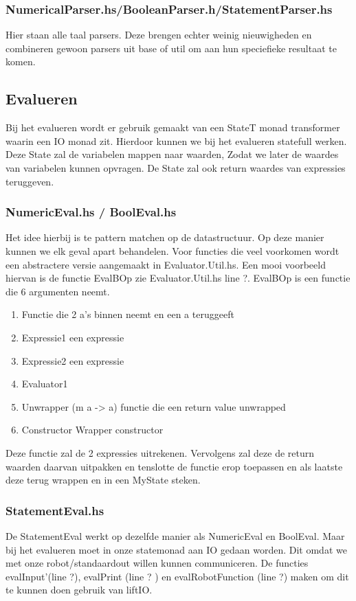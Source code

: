\documentclass[a4paper,10pt]{article}
\begin{document}
  \subsubsection{NumericalParser.hs/BooleanParser.h/StatementParser.hs}
  Hier staan alle taal parsers. Deze brengen echter weinig nieuwigheden en
  combineren gewoon parsers uit base of util om aan hun speciefieke resultaat te komen.



\subsection{Evalueren}
  Bij het evalueren wordt er gebruik gemaakt van een StateT monad transformer waarin een IO monad zit.
  Hierdoor kunnen we bij het evalueren statefull werken. Deze State zal de variabelen mappen naar waarden,
  Zodat we later de waardes van variabelen kunnen opvragen.
  De State zal ook return waardes van expressies teruggeven.
  
  \subsubsection{NumericEval.hs / BoolEval.hs}

    Het idee hierbij is te pattern matchen op de datastructuur. Op deze manier kunnen we elk geval apart behandelen.
    Voor functies die veel voorkomen wordt een abstractere versie aangemaakt in Evaluator.Util.hs.
    Een mooi voorbeeld hiervan is de functie EvalBOp zie Evaluator.Util.hs line ?.
    EvalBOp is een functie die 6 argumenten neemt.
    \begin{enumerate}
      \item Functie die 2 a's binnen neemt en een a teruggeeft
      \item Expressie1 een expressie
      \item Expressie2 een expressie
      \item Evaluator1
      \item Unwrapper (m a -> a) functie die een return value unwrapped
      \item Constructor Wrapper constructor
    \end{enumerate}
    Deze functie zal de 2 expressies uitrekenen.
    Vervolgens zal deze de return waarden daarvan uitpakken en tenslotte
    de functie erop toepassen en als laatste deze terug wrappen en in een MyState steken.

    \subsubsection{StatementEval.hs}
    De StatementEval werkt op dezelfde manier als NumericEval en BoolEval.
    Maar bij het evalueren moet in onze statemonad aan IO gedaan worden.
    Dit omdat we met onze robot/standaardout willen kunnen communiceren.
    De functies evalInput'(line ?), evalPrint (line ? ) en evalRobotFunction (line ?) maken om dit te kunnen doen gebruik van liftIO.
\end{document}
